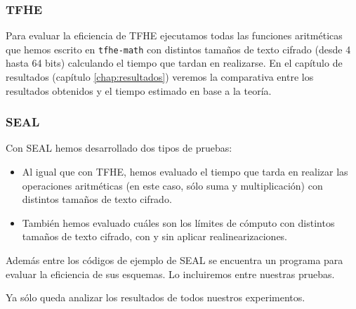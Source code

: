 \subsubsection{TFHE}

Para evaluar la eficiencia de TFHE ejecutamos todas las funciones aritméticas que hemos escrito en \verb|tfhe-math| con distintos tamaños de texto cifrado (desde 4 hasta 64 bits) calculando el tiempo que tardan en realizarse. En el capítulo de resultados (capítulo \ref{chap:resultados}) veremos la comparativa entre los resultados obtenidos y el tiempo estimado en base a la teoría.

\subsubsection{SEAL}

Con SEAL hemos desarrollado dos tipos de pruebas:

\begin{itemize}
    \item Al igual que con TFHE, hemos evaluado el tiempo que tarda en realizar las operaciones aritméticas (en este caso, sólo suma y multiplicación) con distintos tamaños de texto cifrado.
    \item También hemos evaluado cuáles son los límites de cómputo con distintos tamaños de texto cifrado, con y sin aplicar realinearizaciones.
\end{itemize}

Además entre los códigos de ejemplo de SEAL se encuentra un programa para evaluar la eficiencia de sus esquemas. Lo incluiremos entre nuestras pruebas.

Ya sólo queda analizar los resultados de todos nuestros experimentos.
